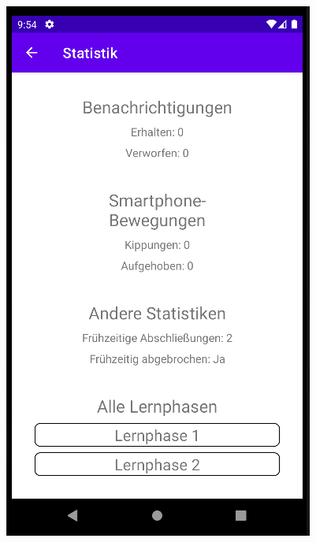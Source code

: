 \documentclass[ngerman]{tutorial}
\begin{document}
\begin{center}
    \includegraphics[scale=0.45]{stats_session_2.png}
\end{center}
\end{document}
